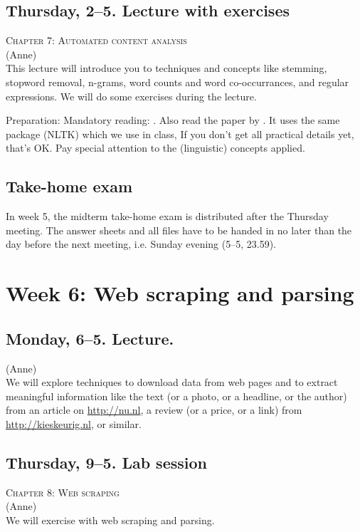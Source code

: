 \subsection*{Thursday, 2--5. Lecture with exercises}
\textsc{ Chapter 7: Automated content analysis}\\
{\footnotesize{(Anne)}\\}
This lecture will introduce you to techniques and concepts like stemming, stopword removal, n-grams, word counts and word co-occurrances, and regular expressions. We will do some exercises during the lecture.

Preparation: Mandatory reading: \citealp{Boumans2016}. Also read the paper by \cite{Madnani}. It uses the same package (NLTK) which we use in class, If you don’t get all practical details yet, that’s OK. Pay special attention to the (linguistic) concepts applied.  

\subsection*{Take-home exam}
In week 5, the midterm take-home exam is distributed after the Thursday meeting. The answer sheets and all files have to be handed in no later than the day before the next meeting, i.e. Sunday evening (5--5, 23.59).

\section*{Week 6: Web scraping and parsing}

\subsection*{Monday, 6--5. Lecture.}
{\footnotesize{(Anne)}\\}
We will explore techniques to download data from web pages and to extract meaningful information like the text (or a photo, or a headline, or the author) from an article on \url{http://nu.nl}, a review (or a price, or a link) from \url{http://kieskeurig.nl}, or similar. 

\subsection*{Thursday, 9--5. Lab session}
\textsc{ Chapter 8: Web scraping}\\
{\footnotesize{(Anne)}\\}
We will exercise with web scraping and parsing.

